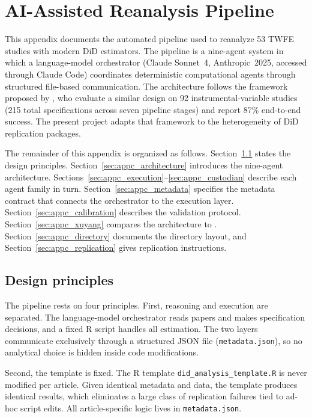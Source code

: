 \chapter{AI-Assisted Reanalysis Pipeline}
\label{AppendixC}

This appendix documents the automated pipeline used to reanalyze 53 TWFE studies with modern DiD estimators. The pipeline is a nine-agent system in which a language-model orchestrator (Claude Sonnet~4, Anthropic~2025, accessed through Claude Code) coordinates deterministic computational agents through structured file-based communication. The architecture follows the framework proposed by \textcite{xu2026scaling}, who evaluate a similar design on 92 instrumental-variable studies (215 total specifications across seven pipeline stages) and report 87\% end-to-end success. The present project adapts that framework to the heterogeneity of DiD replication packages.

The remainder of this appendix is organized as follows. Section~\ref{sec:appc_design} states the design principles. Section~\ref{sec:appc_architecture} introduces the nine-agent architecture. Sections~\ref{sec:appc_execution}--\ref{sec:appc_custodian} describe each agent family in turn. Section~\ref{sec:appc_metadata} specifies the metadata contract that connects the orchestrator to the execution layer. Section~\ref{sec:appc_calibration} describes the validation protocol. Section~\ref{sec:appc_xuyang} compares the architecture to \textcite{xu2026scaling}. Section~\ref{sec:appc_directory} documents the directory layout, and Section~\ref{sec:appc_replication} gives replication instructions.


\section{Design principles}
\label{sec:appc_design}

The pipeline rests on four principles. First, reasoning and execution are separated. The language-model orchestrator reads papers and makes specification decisions, and a fixed R script handles all estimation. The two layers communicate exclusively through a structured JSON file (\texttt{metadata.json}), so no analytical choice is hidden inside code modifications.

Second, the template is fixed. The R template \texttt{did\_analysis\_template.R} is never modified per article. Given identical metadata and data, the template produces identical results, which eliminates a large class of replication failures tied to ad-hoc script edits. All article-specific logic lives in \texttt{metadata.json}.

